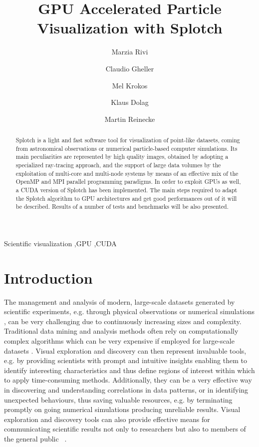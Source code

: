 \documentclass[1p]{elsarticle}
\begin{document}
\begin{frontmatter}

\title{GPU Accelerated Particle Visualization with Splotch}
\author[1]{Marzia Rivi} 
\address[1]{Department of Physics, University of Oxford, Keble Road, OX1 3RH Oxford, United Kingdom}
\author[2]{Claudio Gheller}
\address[2]{ETH-CSCS, via Trevano 131, 6900 Lugano, Switzerland}
\author[3]{Mel Krokos}
\address[3]{...  University of Portsmouth, ...}
\author[4]{Klaus Dolag}
\address[4]{}
\author[5]{Martin Reinecke}
\address[5]{}

\begin{abstract}
Splotch is a light and fast software tool for visualization of point-like datasets, coming from astronomical observations or numerical particle-based computer simulations. Its main peculiarities are represented by high quality images, obtained by adopting a specialized ray-tracing approach, and the support of large data volumes by the exploitation of multi-core and multi-node systems by means of an effective mix of the OpenMP and MPI parallel programming paradigms. In order to exploit GPUs as well, a CUDA version of Splotch has been implemented. The main steps required to adapt the Splotch algorithm to GPU architectures and get good performances out of it will be described. Results of a number of tests and benchmarks will be also presented. 
\end{abstract}

\begin{keyword}
Scientific visualization \sep GPU \sep CUDA
\end{keyword}

\end{frontmatter}

\section{Introduction}
\label{sec:intro}

The management and analysis of modern, large-scale datasets generated by scientific experiments, e.g. through physical observations \cite{} or numerical simulations \cite{}, can be very challenging due to continuously increasing sizes and complexity. Traditional data mining and analysis methods often rely on computationally complex
algorithms \cite{} which can be very expensive if employed for 
large-scale datasets \cite{}. Visual exploration and discovery can then represent invaluable tools, e.g. by providing scientists with prompt and intuitive insights enabling them to identify interesting characteristics and thus define regions of interest within which
to apply time-consuming methods. Additionally, they can be a very effective way in discovering and understanding correlations in data patterns, or in identifying unexpected behaviours, thus saving valuable resources, e.g. by terminating promptly on going numerical simulations producing unreliable results. Visual exploration and discovery tools can also provide effective means for communicating scientific results not only to researchers \cite{} but also to members of the general public ~\cite{SpaceMission}.
\end{document}
